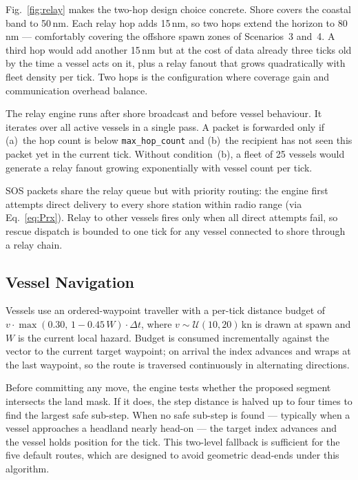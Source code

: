 \documentclass[cameraready]{Interspeech}
\begin{document}
Fig.~\ref{fig:relay} makes the two-hop design choice concrete. Shore covers the coastal band to 50\,nm. Each relay hop adds 15\,nm, so two hops extend the horizon to 80\,nm — comfortably covering the offshore spawn zones of Scenarios~3 and~4. A third hop would add another 15\,nm but at the cost of data already three ticks old by the time a vessel acts on it, plus a relay fanout that grows quadratically with fleet density per tick. Two hops is the configuration where coverage gain and communication overhead balance.

The relay engine runs after shore broadcast and before vessel behaviour. It iterates over all active vessels in a single pass. A packet is forwarded only if (a)~the hop count is below \texttt{max\_hop\_count} and (b)~the recipient has not seen this packet yet in the current tick. Without condition~(b), a fleet of 25 vessels would generate a relay fanout growing exponentially with vessel count per tick.

SOS packets share the relay queue but with priority routing: the engine first attempts direct delivery to every shore station within radio range (via Eq.~\ref{eq:Prx}). Relay to other vessels fires only when all direct attempts fail, so rescue dispatch is bounded to one tick for any vessel connected to shore through a relay chain.

\subsection{Vessel Navigation}
\label{sec:nav-impl}

Vessels use an ordered-waypoint traveller with a per-tick distance budget of $v\cdot\max(0.30,\,1-0.45\,W)\cdot\Delta t$, where $v\sim\mathcal{U}(10,20)$\,kn is drawn at spawn and $W$ is the current local hazard. Budget is consumed incrementally against the vector to the current target waypoint; on arrival the index advances and wraps at the last waypoint, so the route is traversed continuously in alternating directions.

Before committing any move, the engine tests whether the proposed segment intersects the land mask. If it does, the step distance is halved up to four times to find the largest safe sub-step. When no safe sub-step is found — typically when a vessel approaches a headland nearly head-on — the target index advances and the vessel holds position for the tick. This two-level fallback is sufficient for the five default routes, which are designed to avoid geometric dead-ends under this algorithm.
\end{document}
